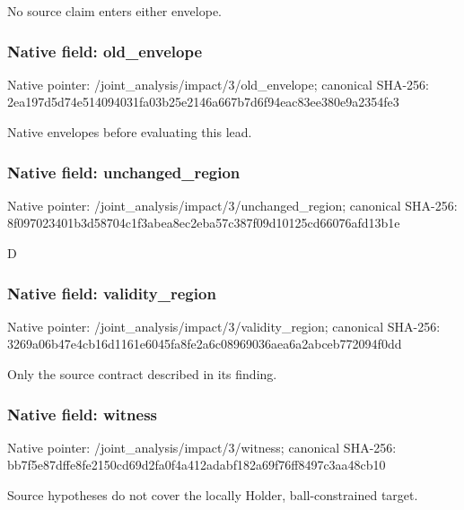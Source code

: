 \documentclass[10pt,a4paper]{article}
\begin{document}
\begingroup\raggedright\sloppy No source claim enters either envelope.\par\endgroup

\subsubsection{Native field: old\_\allowbreak{}envelope}
Native pointer: /joint\_\allowbreak{}analysis/impact/3/old\_\allowbreak{}envelope; canonical SHA-256: 2ea197d5d74e514094031fa03b25e2146a667b7d6f94eac83ee380e9a2354fe3

\begingroup\raggedright\sloppy Native envelopes before evaluating this lead.\par\endgroup

\subsubsection{Native field: unchanged\_\allowbreak{}region}
Native pointer: /joint\_\allowbreak{}analysis/impact/3/unchanged\_\allowbreak{}region; canonical SHA-256: 8f097023401b3d58704c1f3abea8ec2eba57c387f09d10125cd66076afd13b1e

\begingroup\raggedright\sloppy D\par\endgroup

\subsubsection{Native field: validity\_\allowbreak{}region}
Native pointer: /joint\_\allowbreak{}analysis/impact/3/validity\_\allowbreak{}region; canonical SHA-256: 3269a06b47e4cb16d1161e6045fa8fe2a6c08969036aea6a2abceb772094f0dd

\begingroup\raggedright\sloppy Only the source contract described in its finding.\par\endgroup

\subsubsection{Native field: witness}
Native pointer: /joint\_\allowbreak{}analysis/impact/3/witness; canonical SHA-256: bb7f5e87dffe8fe2150cd69d2fa0f4a412adabf182a69f76ff8497c3aa48cb10

\begingroup\raggedright\sloppy Source hypotheses do not cover the locally Holder,\allowbreak{} ball-constrained target.\par\endgroup
\end{document}
